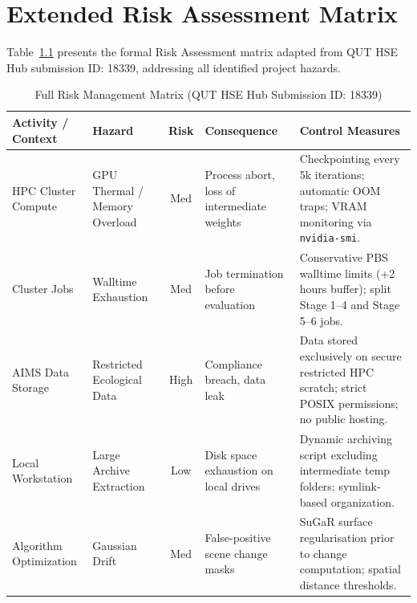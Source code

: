 \chapter{Extended Risk Assessment Matrix}
\label{app:risk_assessment}

Table~\ref{tab:app_risk_full} presents the formal Risk Assessment matrix adapted from QUT HSE Hub submission ID: 18339, addressing all identified project hazards.

\begin{table}[htbp]
\centering
\small
\caption{Full Risk Management Matrix (QUT HSE Hub Submission ID: 18339)}
\label{tab:app_risk_full}
\begin{tabularx}{\textwidth}{p{2.6cm} p{2.2cm} c p{3.2cm} X}
\toprule
\textbf{Activity / Context} & \textbf{Hazard} & \textbf{Risk} & \textbf{Consequence} & \textbf{Control Measures} \\
\midrule
HPC Cluster Compute & GPU Thermal / Memory Overload & Med & Process abort, loss of intermediate weights & Checkpointing every 5k iterations; automatic OOM traps; VRAM monitoring via \texttt{nvidia-smi}. \\
\addlinespace
Cluster Jobs & Walltime Exhaustion & Med & Job termination before evaluation & Conservative PBS walltime limits (+2 hours buffer); split Stage 1--4 and Stage 5--6 jobs. \\
\addlinespace
AIMS Data Storage & Restricted Ecological Data & High & Compliance breach, data leak & Data stored exclusively on secure restricted HPC scratch; strict POSIX permissions; no public hosting. \\
\addlinespace
Local Workstation & Large Archive Extraction & Low & Disk space exhaustion on local drives & Dynamic archiving script excluding intermediate temp folders; symlink-based organization. \\
\addlinespace
Algorithm Optimization & Gaussian Drift & Med & False-positive scene change masks & SuGaR surface regularisation prior to change computation; spatial distance thresholds. \\
\bottomrule
\end{tabularx}
\end{table}

